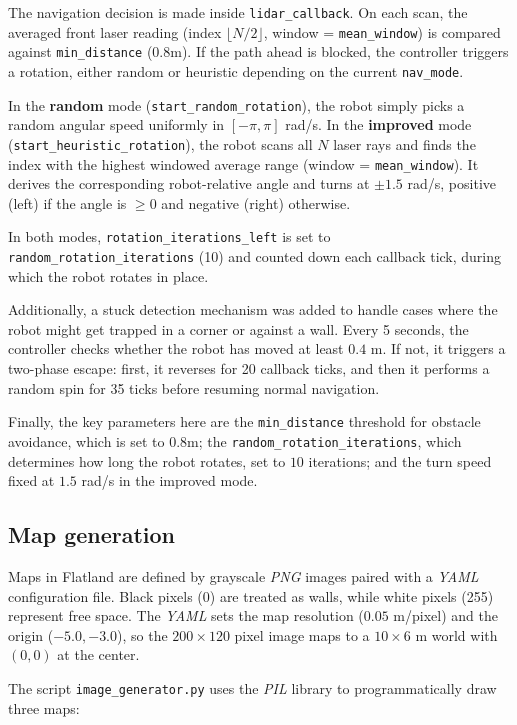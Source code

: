 \documentclass[12pt]{article}
\begin{document}
The navigation decision is made inside \texttt{lidar\_callback}. On each scan, the averaged front
laser reading (index $\lfloor N/2 \rfloor$, window = \texttt{mean\_window}) is compared against
\texttt{min\_distance} ($0.8$m). If the path ahead is blocked, the controller triggers a rotation,
either random or heuristic depending on the current \texttt{nav\_mode}.

In the \textbf{random} mode (\texttt{start\_random\_rotation}), the robot simply picks a random
angular speed uniformly in $[-\pi, \pi]$ rad/s. In the \textbf{improved} mode
(\texttt{start\_heuristic\_rotation}), the robot scans all $N$ laser rays and finds the index with
the highest windowed average range (window = \texttt{mean\_window}). It derives the corresponding
robot-relative angle and turns at $\pm 1.5$ rad/s, positive (left) if the angle is $\ge 0$ and
negative (right) otherwise.

In both modes, \texttt{rotation\_iterations\_left} is set to \texttt{random\_rotation\_iterations}
(10) and counted down each callback tick, during which the robot rotates in place.

Additionally, a stuck detection mechanism was added to handle cases where the robot might get
trapped in a corner or against a wall. Every 5 seconds, the controller checks whether the robot has
moved at least $0.4$ m. If not, it triggers a two-phase escape: first, it reverses for 20 callback
ticks, and then it performs a random spin for 35 ticks before resuming normal navigation.

Finally, the key parameters here are the \texttt{min\_distance} threshold for obstacle avoidance,
which is set to $0.8$m; the \texttt{random\_rotation\_iterations}, which determines how long the
robot rotates, set to $10$ iterations; and the turn speed fixed at $1.5$ rad/s in the improved mode.

\subsection{Map generation}

Maps in Flatland are defined by grayscale \textit{PNG} images paired with a \textit{YAML}
configuration file. Black pixels (0) are treated as walls, while white pixels (255) represent free
space. The \textit{YAML} sets the map resolution ($0.05$ m/pixel) and the origin ($-5.0, -3.0$), so
the $200 \times 120$ pixel image maps to a $10 \times 6$ m world with $(0,0)$ at the center.

The script \texttt{image\_generator.py} uses the \textit{PIL} library to programmatically draw three
maps:
\end{document}
